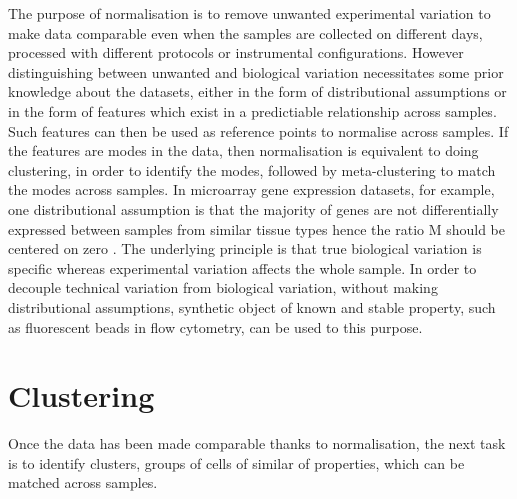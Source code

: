 The purpose of normalisation is to remove unwanted experimental variation to make data comparable even when the samples are
collected on different days, processed with different protocols or instrumental configurations.
However distinguishing between unwanted and biological variation necessitates some prior knowledge about the datasets, either in the form of distributional assumptions
or in the form of features which exist in a predictiable relationship across samples.
Such features can then be used as reference points to normalise across samples.
If the features are modes in the data, then normalisation is equivalent to doing clustering, in order to identify the modes,
followed by meta-clustering to match the modes across samples.
In microarray gene expression datasets, for example, one distributional assumption is that the majority of genes are not differentially expressed between samples from
similar tissue types hence the ratio M should be centered on zero \citet{Smyth:2003ie,Bolstad:2003ia}.
The underlying principle is that true biological variation is specific whereas experimental variation affects the whole sample.
In order to decouple technical variation from biological variation, without making distributional assumptions,
synthetic object of known and stable property, such as fluorescent beads in flow cytometry, can be used to this purpose.



\section{Clustering}


Once the data has been made comparable thanks to normalisation, the next task is to identify clusters, groups of cells of similar of properties,
which can be matched across samples.

